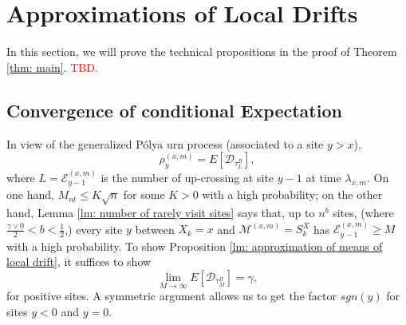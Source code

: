 \documentclass[twoside,12pt,a4paper]{article}
\numberwithin{equation}{section}
\newcommand\TBD{\textcolor{red}{TBD.}}
\begin{document}
\section{Approximations of Local Drifts}\label{sec: approximations}
In this section, we will prove the technical propositions in the proof of Theorem \ref{thm: main}. \TBD


\subsection{Convergence of conditional Expectation}
In view of the generalized P\'{o}lya urn process (associated to a site $y> x$), 
$$\rho^{(x,m)}_y = E[\mathcal{D}_{\tau_L^B}], $$ where
$ L = \mathcal{E}^{(x,m)}_{y-1}$ is the number of up-crossing at site $y-1$ at time $\lambda_{x,m}$.
On one hand, $M_{nt} \leq K\sqrt{n} $ for some $K>0$ with a high probability; on the other hand, Lemma \ref{lm: number of rarely visit sites} says that, up to $n^b$ sites, (where $\frac{\gamma \vee 0}{2}<b<\frac{1}{2}$,) every site $y$ between $X_k=x$ and $\mathcal{M}^{(x,m)} =S_{k}^X$ has $ \mathcal{E}^{(x,m)}_{y-1} \geq M  $ with a high probability. To show Proposition \ref{lm: approximation of means of local drift}, it suffices to show 
\begin{equation}\label{eq: convergence of conditional expectation}
	\lim_{M\to\infty} E[\mathcal{D}_{\tau_M^B}] = \gamma , 
\end{equation} for positive sites. A symmetric argument allows us to get the factor $sgn(y)$ for sites $y<0$ and $y=0$.
\end{document}
